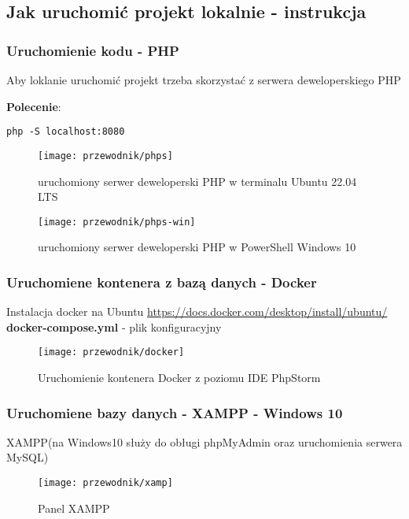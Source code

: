         \subsection{Jak uruchomić projekt lokalnie - instrukcja}


        \subsubsection{Uruchomienie kodu - PHP}
        Aby loklanie uruchomić projekt trzeba skorzystać z serwera deweloperskiego PHP

        \textbf{Polecenie}:
        \begin{lstlisting}
php -S localhost:8080
        \end{lstlisting}
        \newpage




        \begin{figure}[!htb]
            \centering
            \texttt{[image: przewodnik/phps]}
            \caption{uruchomiony serwer deweloperski PHP w terminalu Ubuntu 22.04 LTS }                
        \end{figure}

        \begin{figure}[!htb]
            \centering
            \texttt{[image: przewodnik/phps-win]}
            \caption{uruchomiony serwer deweloperski PHP w PowerShell Windows 10}                
        \end{figure}

        \subsubsection{Uruchomiene kontenera z bazą danych -  Docker}
        Instalacja docker na Ubuntu \url{https://docs.docker.com/desktop/install/ubuntu/}\\
        \textbf{docker-compose.yml} - plik konfiguracyjny \\
        
        \begin{figure}[!htb]
            \centering
            \texttt{[image: przewodnik/docker]}
            \caption{Uruchomienie kontenera Docker z poziomu IDE PhpStorm}                
        \end{figure}


        \pagebreak
        \subsubsection{Uruchomiene bazy danych -  XAMPP - Windows 10}
        XAMPP(na Windows10 służy do obługi phpMyAdmin oraz uruchomienia serwera MySQL)
        \begin{figure}[!htb]
            \centering
            \texttt{[image: przewodnik/xamp]}
            \caption{Panel XAMPP}                
        \end{figure}

